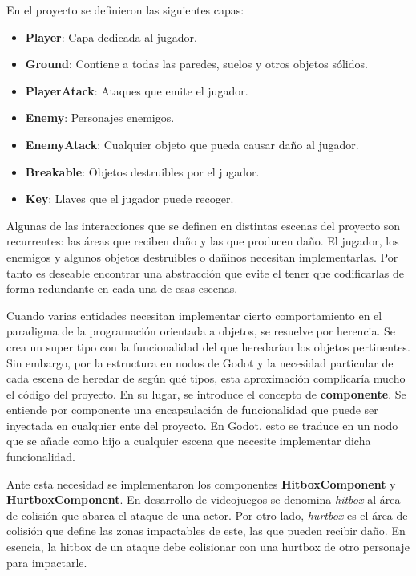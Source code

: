En el proyecto se definieron las siguientes capas:

\begin{itemize}
    \item \textbf{Player}: Capa dedicada al jugador.
    \item \textbf{Ground}: Contiene a todas las paredes, suelos y otros objetos sólidos.
    \item \textbf{PlayerAtack}: Ataques que emite el jugador.
    \item \textbf{Enemy}: Personajes enemigos.
    \item \textbf{EnemyAtack}: Cualquier objeto que pueda causar daño al jugador.
    \item \textbf{Breakable}: Objetos destruibles por el jugador.
    \item \textbf{Key}: Llaves que el jugador puede recoger.
\end{itemize}

Algunas de las interacciones que se definen en distintas escenas del proyecto son recurrentes: las áreas que reciben daño y las que producen daño. El jugador, los enemigos y algunos objetos destruibles o dañinos necesitan implementarlas. Por tanto es deseable encontrar una abstracción que evite el tener que codificarlas de forma redundante en cada una de esas escenas.

Cuando varias entidades necesitan implementar cierto comportamiento en el paradigma de la programación orientada a objetos, se resuelve por herencia. Se crea un super tipo con la funcionalidad del que heredarían los objetos pertinentes. Sin embargo, por la estructura en nodos de Godot y la necesidad particular de cada escena de heredar de según qué tipos, esta aproximación complicaría mucho el código del proyecto. En su lugar, se introduce el concepto de \textbf{componente}. Se entiende por componente una encapsulación de funcionalidad que puede ser inyectada en cualquier ente del proyecto. En Godot, esto se traduce en un nodo que se añade como hijo a cualquier escena que necesite implementar dicha funcionalidad.

Ante esta necesidad se implementaron los componentes \textbf{HitboxComponent} y \textbf{HurtboxComponent}. En desarrollo de videojuegos se denomina \textit{hitbox} al área de colisión que abarca el ataque de una actor. Por otro lado, \textit{hurtbox} es el área de colisión que define las zonas impactables de este, las que pueden recibir daño. En esencia, la hitbox de un ataque debe colisionar con una hurtbox de otro personaje para impactarle.

